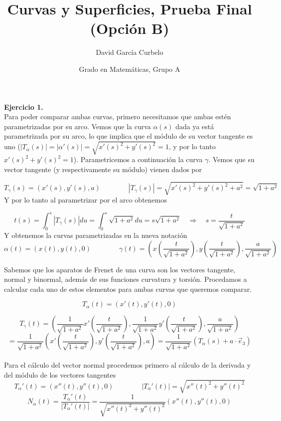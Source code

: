 \documentclass[fleqn]{article}
\author{David García Curbelo}
\title{Curvas y Superficies, Prueba Final (Opción B)}
\date{Grado en Matemáticas, Grupo A}
\def\next{\quad \Rightarrow \quad}
\begin{document}
    \maketitle
    \setcounter{page}{1}
    \pagestyle{plain}



    \textbf{Ejercicio 1. } \\

    Para poder comparar ambas curvas, primero necesitamos que ambas estén parametrizadas por su arco. Vemos que la curva $\alpha(s)$ dada ya está parametrizada por su arco, 
    lo que implica que el módulo de su vector tangente es uno ($|T_{\alpha}(s)| = |\alpha'(s)| = \sqrt{x'(s)^2 + y'(s)^2} = 1$, y por lo tanto $x'(s)^2 + y'(s)^2 = 1$). 
    Parametricemos a continuación la curva $\gamma$. Vemos que su vector tangente (y respectivamente su módulo) vienen dados por

    $$T_{\gamma}(s) = (x'(s), y'(s), a) \quad \quad \quad \quad |T_{\gamma}(s)| = \sqrt{x'(s)^2 + y'(s)^2 + a^2} = \sqrt{1 + a^2} $$
    Y por lo tanto al parametrizar por el arco obtenemos

    $$t(s) = \int_0^s |T_{\gamma}(s)| du = \int_0^s \sqrt{1 + a^2} du = s\sqrt{1 + a^2} \next s = \frac{t}{\sqrt{1 + a^2}}$$
    Y obtenemos la curvas parametrizadas en la nueva notación 
    $$\alpha(t) = (x(t), y(t), 0) \quad \quad \quad \quad \gamma(t) = \left(x \left(\frac{t}{\sqrt{1 + a^2}}\right), y \left(\frac{t}{\sqrt{1 + a^2}}\right), \frac{a}{\sqrt{1 + a^2}} \right) $$
    
    Sabemos que los aparatos de Frenet de una curva son los vectores tangente, normal y binormal, además de sus funciones curvatura y torsión. Procedamos a calcular cada uno de estos elementos
    para ambas curvas que queremos comparar.

    $$T_{\alpha}(t) = \left( x'(t), y'(t), 0 \right)$$

    $$T_{\gamma}(t) = \left(\frac{1}{\sqrt{1 + a^2}} x'\left(\frac{t}{\sqrt{1 + a^2}}\right), \frac{1}{\sqrt{1 + a^2}} y'\left(\frac{t}{\sqrt{1 + a^2}}\right), \frac{a}{\sqrt{1 + a^2}} \right)$$
    $$ = \frac{1}{\sqrt{1 + a^2}}\left( x'\left(\frac{t}{\sqrt{1 + a^2}}\right), y'\left(\frac{t}{\sqrt{1 + a^2}}\right), a\right) = 
    \frac{1}{\sqrt{1 + a^2}} \left( T_{\alpha}\left(s\right) + a\cdot \vec{e}_3 \right)$$\\

    Para el cálculo del vector normal procedemos primero al cálculo de la derivada y del módulo de los vectores tangentes
    $$T_{\alpha}'(t) = ( x''(t), y''(t), 0) \quad \quad \quad \quad |T_{\alpha}'(t)| = \sqrt{x''(t)^2 + y''(t)^2}$$
    $$ N_{\alpha}(t) = \frac{T_{\alpha}'(t)}{|T_{\alpha}'(t)|} = \frac{1}{\sqrt{x''(t)^2 + y''(t)^2}} ( x''(t), y''(t), 0) $$
\end{document}

